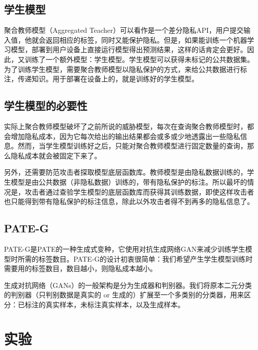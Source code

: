 \documentclass[a4paper]{article}
\begin{document}
\subsection*{学生模型}

聚合教师模型（Aggregated Teacher）可以看作是一个差分隐私API，用户提交输入值，他就会返回相应的标签，同时又能保护隐私。但是，如果能训练一个机器学习模型，部署到用户设备上直接运行模型得出预测结果，这样的话肯定会更好。因此，又训练了一个额外模型：学生模型。学生模型可以获得未标记的公共数据集。为了训练学生模型，需要聚合教师模型以隐私保护的方式，来给公共数据进行标注，传递知识。用于部署在设备上的，就是训练好的学生模型。
\subsection*{学生模型的必要性}

实际上聚合教师模型破坏了之前所说的威胁模型，每次在查询聚合教师模型时，都会增加隐私成本，因为它每次给出的输出结果都会或多或少地透露出一些隐私信息。然而，当学生模型训练好之后，只能对聚合教师模型进行固定数量的查询，那么隐私成本就会被固定下来了。

另外，还需要防范攻击者探取模型底层函数库。教师模型是由隐私数据训练的，学生模型是由公共数据（非隐私数据）训练的，带有隐私保护的标注。所以最坏的情况是，攻击者通过查验学生模型的底层函数库而获得其训练数据，即使这样攻击者也只能得到带有隐私保护的标注信息，除此以外攻击者得不到再多的隐私信息了。

\subsection*{PATE-G}

PATE-G是PATE的一种生成式变种，它使用对抗生成网络GAN来减少训练学生模型时所需的标签数目。PATE-G的设计初衷很简单：我们希望产生学生模型训练时需要用的标签数目，数目越小，则隐私成本越小。

生成对抗网络（GANs）的一般架构是分为生成器和判别器。我们将原本二元分类的判别器（只判别数据是真实的 or 生成的）扩展至一个多类别的分类器，用来区分：已标注的真实样本，未标注真实样本，以及生成样本\cite{Salimans2016ImprovedTF}。

\section{实验}
\end{document}
